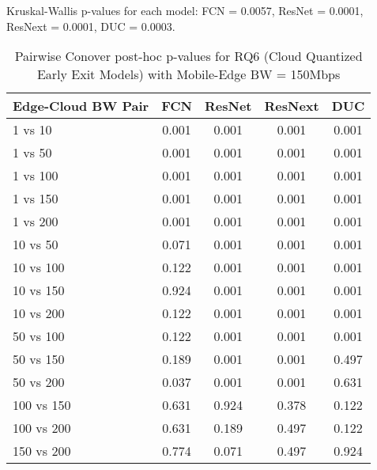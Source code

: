 \begin{table}[h]
\centering
\caption{Pairwise Conover post-hoc p-values for RQ6 (Cloud Quantized Early Exit Models) with Mobile-Edge BW = 150Mbps}
\label{tab:conover_cloud_quantized_earlyexit_me150}
\smallskip
Kruskal-Wallis p-values for each model: FCN = 0.0057, ResNet = 0.0001, ResNext = 0.0001, DUC = 0.0003.

\begin{tabular}{lcccc}
\toprule
Edge-Cloud BW Pair & FCN & ResNet & ResNext & DUC \\
\midrule
1 vs 10 & 0.001 & 0.001 & 0.001 & 0.001 \\
1 vs 50 & 0.001 & 0.001 & 0.001 & 0.001 \\
1 vs 100 & 0.001 & 0.001 & 0.001 & 0.001 \\
1 vs 150 & 0.001 & 0.001 & 0.001 & 0.001 \\
1 vs 200 & 0.001 & 0.001 & 0.001 & 0.001 \\
10 vs 50 & 0.071 & 0.001 & 0.001 & 0.001 \\
10 vs 100 & 0.122 & 0.001 & 0.001 & 0.001 \\
10 vs 150 & 0.924 & 0.001 & 0.001 & 0.001 \\
10 vs 200 & 0.122 & 0.001 & 0.001 & 0.001 \\
50 vs 100 & 0.122 & 0.001 & 0.001 & 0.001 \\
50 vs 150 & 0.189 & 0.001 & 0.001 & 0.497 \\
50 vs 200 & 0.037 & 0.001 & 0.001 & 0.631 \\
100 vs 150 & 0.631 & 0.924 & 0.378 & 0.122 \\
100 vs 200 & 0.631 & 0.189 & 0.497 & 0.122 \\
150 vs 200 & 0.774 & 0.071 & 0.497 & 0.924 \\
\bottomrule
\end{tabular}
\end{table}

